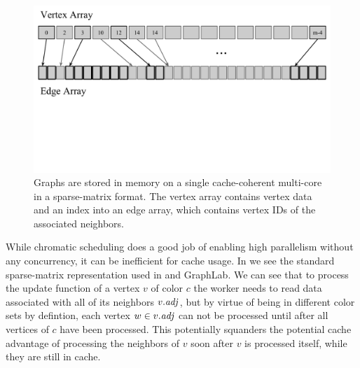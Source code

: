 \begin{figure}[!h]
\centering
\includegraphics[keepaspectratio,width=4.5in,clip,trim=0 5cm 0 0]{sparse_matrix_representation.pdf}
\caption{Graphs are stored in memory on a single cache-coherent
multi-core in a sparse-matrix format.  The vertex array contains
vertex data and an index into an edge array, which contains vertex
IDs of the associated neighbors.}
\label{fig:layout}
\end{figure}


While chromatic scheduling does a good job of enabling high parallelism
without any concurrency, it can be inefficient for cache usage.  In 
 we see the standard sparse-matrix representation
used in  and GraphLab.  We can see that to process
the update function of a vertex $v$ of color $c$ the worker needs to read data
associated with all of its neighbors $\attrib{v}{\id{adj}}$, but 
by virtue of being in different color sets by defintion, each
vertex $w \in \attrib{v}{\id{adj}}$ can not be processed until
after all vertices of $c$ have been processed.  This potentially
squanders the potential cache advantage of processing the neighbors
of $v$ soon after $v$ is processed itself, while they are still
in cache.

